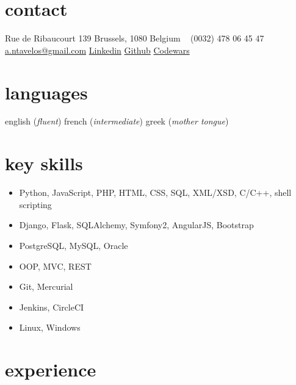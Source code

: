\documentclass[]{friggeri-cv} %
\begin{document}


\begin{aside} %
\section{contact}
Rue de Ribaucourt 139
Brussels, 1080
Belgium
~
(0032) 478 06 45 47
~
\href{mailto:a.ntavelos@gmail.com}{a.ntavelos@gmail.com}
\href{http://www.linkedin.com/in/antavelos}{Linkedin}
\href{https://github.com/antavelos}{Github}
\href{http://www.codewars.com/users/dvc}{Codewars}
\section{languages}
english (\textit{fluent})
french (\textit{intermediate})
greek (\textit{mother tongue})
\end{aside}


\section{key skills}
\begin{itemize}
\item Python, JavaScript, PHP, HTML, CSS, SQL, XML/XSD, C/C++, shell scripting
\item Django, Flask, SQLAlchemy, Symfony2, AngularJS, Bootstrap
\item PostgreSQL, MySQL, Oracle
\item OOP, MVC, REST
\item Git, Mercurial
\item Jenkins, CircleCI
\item Linux, Windows
\end{itemize}

\section{experience}
\end{document}

